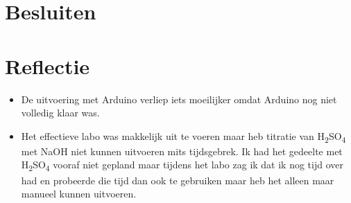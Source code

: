 \documentclass[11pt]{report}
\begin{document}
\section{Besluiten}

\section{Reflectie}
\begin{itemize}
    \item De uitvoering met Arduino verliep iets moeilijker omdat Arduino nog niet volledig klaar was.
    \item Het effectieve labo was makkelijk uit te voeren maar heb titratie van H\textsubscript{2}SO\textsubscript{4} met NaOH niet kunnen uitvoeren mits tijdsgebrek. Ik had het gedeelte met H\textsubscript{2}SO\textsubscript{4} vooraf niet gepland maar tijdens het labo zag ik dat ik nog tijd over had en probeerde die tijd dan ook te gebruiken maar heb het alleen maar manueel kunnen uitvoeren.
\end{itemize}

\end{document}
